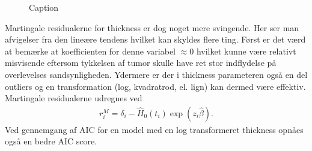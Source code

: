 \newpage
\begin{figure}[h]
    \centering
    \hfill
  \hfill
    \caption{Caption}
    \label{fig:enter-label}
\end{figure}

\noindent Martingale residualerne for thickness er dog noget mere svingende. Her ser man afvigelser fra den lineære tendens hvilket kan skyldes flere ting. Først er det værd at bemærke at koefficienten for denne variabel $\approx 0$ hvilket kunne være relativt misvisende eftersom tykkelsen af tumor skulle have ret stor indflydelse på overlevelses sandsynligheden. Ydermere er der i thickness parameteren også en del outliers og en transformation (log, kvadratrod, el. lign) kan dermed være effektiv.
Martingale residualerne udregnes ved
\begin{align*}
    r_i^M = \delta_i - \hat{H}_0(t_i) \exp(z_i \hat{\beta}).
\end{align*}
Ved gennemgang af AIC for en model med en log transformeret thickness opnåes også en bedre AIC score.

